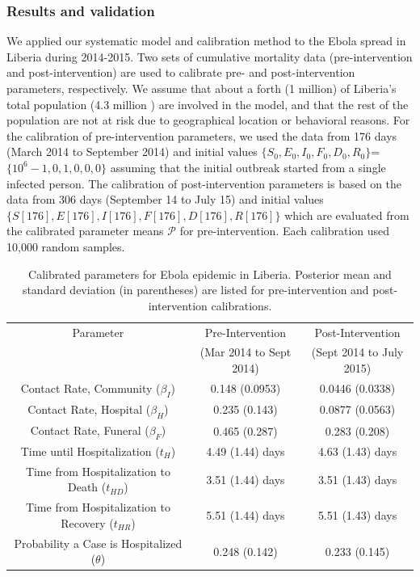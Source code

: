 \subsubsection{Results and validation}
We applied our systematic model and calibration method to the Ebola spread in Liberia during 2014-2015. Two sets of cumulative mortality data (pre-intervention and post-intervention) are used to calibrate pre- and post-intervention parameters, respectively. We assume that about a forth (1 million) of Liberia's total population (4.3 million \cite{LiberiaPop}) are involved in the model, and that the rest of the population are not at risk due to geographical location or behavioral reasons. For the calibration of pre-intervention parameters, we used the data from 176 days (March 2014 to September 2014) and initial values $\{S_0,E_0,I_0,F_0,D_0,R_0\}$=$\{10^6-1,0,1,0,0,0\}$ assuming that the initial outbreak started from a single infected person. The calibration of post-intervention parameters is based on the data from 306 days (September 14 to July 15) and initial values $\{S[176],E[176],I[176],F[176],D[176],R[176]\}$ which are evaluated from the calibrated parameter means $\mathcal{P}$ for pre-intervention. Each calibration used 10,000 random samples.

\begin{table}[ht]
\centering %
\begin{tabular}{c  c c}
\hline\hline %
Parameter &  Pre-Intervention  & Post-Intervention \\ [0.5ex]
 & (Mar 2014 to Sept 2014) &  (Sept 2014 to July 2015)\\ [0.5ex] %
\hline %
{Contact Rate, Community  (${\beta_{I}}$) }& {0.148 (0.0953)} & {0.0446 (0.0338)}  \\
Contact Rate, Hospital  ($\beta_{H}$) & 0.235 (0.143) & 0.0877 (0.0563) \\
Contact Rate, Funeral  ($\beta_{F}$) & 0.465 (0.287)& 0.283 (0.208) \\
Time until Hospitalization (${t_{H}}$) & 4.49 (1.44) days & 4.63 (1.43) days  \\
Time from Hospitalization to Death (${t_{HD}}$) & 3.51 (1.44) days & 3.51 (1.43) days  \\
Time from Hospitalization to Recovery (${t_{HR}}$) & 5.51 (1.44) days & 5.51 (1.43) days \\
Probability a Case is Hospitalized ($\theta$) & 0.248 (0.142) & 0.233 (0.145) \\
[1ex]
\hline
\end{tabular}
\caption{Calibrated parameters for Ebola epidemic in Liberia. Posterior mean and standard deviation (in parentheses) are listed for pre-intervention and post-intervention calibrations.}%
\label{tab:calibratedParameters}
\end{table}

